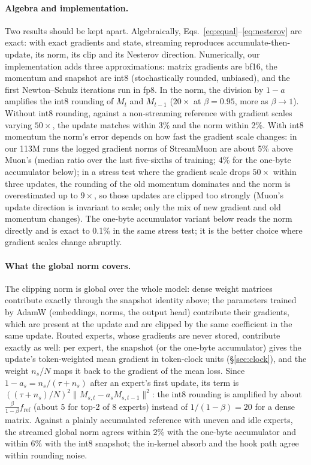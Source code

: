 \documentclass[10pt]{article}
\newcommand{\method}{StreamMuon}\newcommand{\lite}{StreamMuon-Lite}
\begin{document}
\paragraph{Algebra and implementation.} Two results should be kept apart. Algebraically, Eqs.~\ref{eq:equal}--\ref{eq:nesterov}
are exact: with exact gradients and state, streaming reproduces accumulate-then-update, its norm, its clip and its
Nesterov direction. Numerically, our implementation adds three approximations: matrix gradients are bf16, the
momentum and snapshot are int8 (stochastically rounded, unbiased), and the first Newton--Schulz iterations run in
fp8. In the norm, the division by $1-a$ amplifies the int8 rounding of $M_t$ and $M_{t-1}$ ($20\times$ at
$\beta=0.95$, more as $\beta\to1$). Without int8 rounding, against a non-streaming reference with gradient scales varying
$50\times$, the update matches within 3\% and the norm within 2\%. With int8 momentum the norm's error depends on how
fast the gradient scale changes: in our 113M runs the logged gradient norms of \method{} are about 5\% above Muon's
(median ratio over the last five-sixths of training; 4\% for the one-byte accumulator below); in a stress test where the gradient scale drops $50\times$ within three updates, the
rounding of the old momentum dominates and the norm is overestimated up to $9\times$, so those updates are clipped too
strongly (Muon's update direction is invariant to scale; only the mix of new gradient and old momentum changes). The
one-byte accumulator variant below reads the norm directly and is exact to 0.1\% in the same stress test; it is the
better choice where gradient scales change abruptly.

\paragraph{What the global norm covers.} The clipping norm is global over the whole model: dense weight matrices
contribute exactly through the snapshot identity above; the parameters trained by AdamW (embeddings, norms, the output
head) contribute their gradients, which are present at the update and are clipped by the same coefficient in the same
update. Routed experts, whose gradients are never stored, contribute exactly as well: per expert, the snapshot (or
the one-byte accumulator) gives the update's token-weighted mean gradient in token-clock units (\S\ref{sec:clock}), and
the weight $n_s/N$ maps it back to the gradient of the mean loss. Since $1-a_s=n_s/(\tau+n_s)$ after an expert's first
update, its term is $((\tau+n_s)/N)^2\|M_{s,t}-a_sM_{s,t-1}\|^2$: the int8 rounding is amplified by about
$\tfrac{\beta}{1-\beta}f_{\mathrm{ref}}$ (about 5 for top-2 of 8 experts) instead of $1/(1-\beta)=20$ for a dense matrix. Against a plainly accumulated reference with uneven
and idle experts, the streamed global norm agrees within 2\% with the one-byte accumulator and within 6\% with the
int8 snapshot; the in-kernel absorb and the hook path agree within rounding noise.
\end{document}
